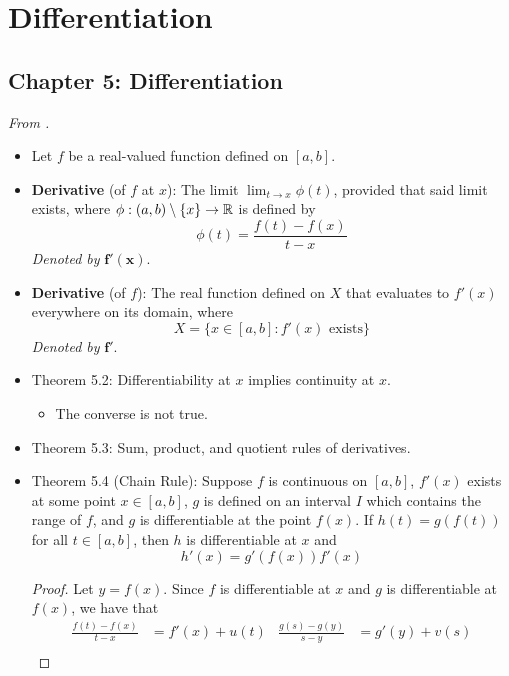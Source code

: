 \documentclass[../../notes.tex]{subfiles}
\begin{document}
\chapter{Differentiation}
\section{Chapter 5: Differentiation}
\emph{From \textcite{bib:Rudin}.}
\begin{itemize}
    \item {}Let $f$ be a real-valued function defined on $[a,b]$.
    \item \textbf{Derivative} (of $f$ at $x$): The limit $\lim_{t\to x}\phi(t)$, provided that said limit exists, where $\phi:(a,b)\setminus\{x\}\to\mathbb{R}$ is defined by
    \begin{equation*}
        \phi(t) = \frac{f(t)-f(x)}{t-x}
    \end{equation*}
    \emph{Denoted by} $\bm{f'(x)}$.
    \item \textbf{Derivative} (of $f$): The real function defined on $X$ that evaluates to $f'(x)$ everywhere on its domain, where
    \begin{equation*}
        X = \{x\in[a,b]:f'(x)\text{ exists}\}
    \end{equation*}
    \emph{Denoted by} $\bm{f'}$.
    \item Theorem 5.2: Differentiability at $x$ implies continuity at $x$.
    \begin{itemize}
        \item The converse is not true.
    \end{itemize}
    \item Theorem 5.3: Sum, product, and quotient rules of derivatives.
    \item Theorem 5.4 (Chain Rule): Suppose $f$ is continuous on $[a,b]$, $f'(x)$ exists at some point $x\in[a,b]$, $g$ is defined on an interval $I$ which contains the range of $f$, and $g$ is differentiable at the point $f(x)$. If $h(t)=g(f(t))$ for all $t\in[a,b]$, then $h$ is differentiable at $x$ and
    \begin{equation*}
        h'(x) = g'(f(x))f'(x)
    \end{equation*}
    \begin{proof}
        Let $y=f(x)$. Since $f$ is differentiable at $x$ and $g$ is differentiable at $f(x)$, we have that
        \begin{align*}
            \frac{f(t)-f(x)}{t-x} &= f'(x)+u(t)&
                \frac{g(s)-g(y)}{s-y} &= g'(y)+v(s)\\

\end{align*}
\end{proof}
\end{itemize}
\end{document}
